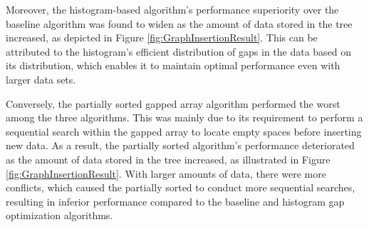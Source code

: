 Moreover, the histogram-based algorithm's performance superiority over the baseline algorithm was found to widen as the amount of data stored in the \learnindex tree increased, as depicted in Figure \ref{fig:GraphInsertionResult}. This can be attributed to the histogram's efficient distribution of gaps in the data based on its distribution, which enables it to maintain optimal performance even with larger data sets.

Conversely, the partially sorted gapped array algorithm performed the worst among the three algorithms. This was mainly due to its requirement to perform a sequential search within the gapped array to locate empty spaces before inserting new data. As a result, the partially sorted algorithm's performance deteriorated as the amount of data stored in the \learnindex tree increased, as illustrated in Figure \ref{fig:GraphInsertionResult}. With larger amounts of data, there were more conflicts, which caused the partially sorted \learnindex to conduct more sequential searches, resulting in inferior performance compared to the baseline and histogram gap optimization algorithms.


